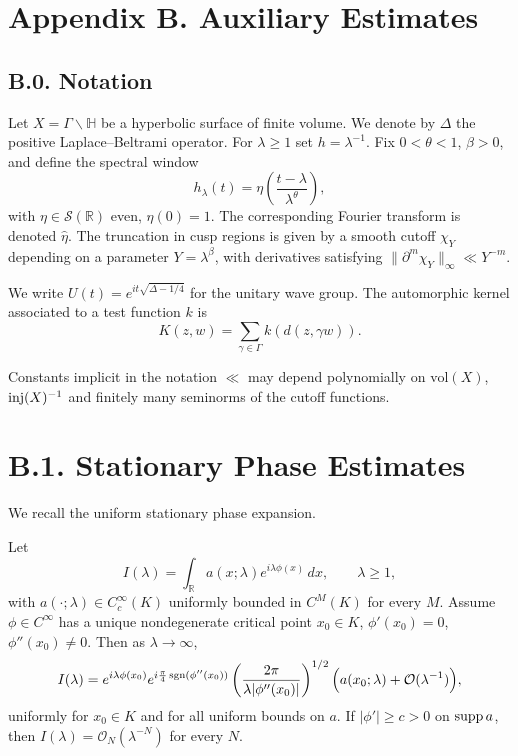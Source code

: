 \appendix
\section*{Appendix B. Auxiliary Estimates}

\subsection*{B.0. Notation}
Let $X=\Gamma\backslash \mathbb{H}$ be a hyperbolic surface of finite volume.
We denote by $\Delta$ the positive Laplace--Beltrami operator.
For $\lambda\ge 1$ set $h=\lambda^{-1}$.
Fix $0<\theta<1$, $\beta>0$, and define the spectral window
\[
h_\lambda(t)=\eta\!\left(\frac{t-\lambda}{\lambda^\theta}\right),
\]
with $\eta\in\mathcal{S}(\mathbb{R})$ even, $\eta(0)=1$.
The corresponding Fourier transform is denoted $\widehat{\eta}$.
The truncation in cusp regions is given by a smooth cutoff $\chi_Y$ depending on a parameter $Y=\lambda^\beta$, with derivatives satisfying $\|\partial^m\chi_Y\|_\infty\ll Y^{-m}$.

We write $U(t)=e^{it\sqrt{\Delta-1/4}}$ for the unitary wave group.
The automorphic kernel associated to a test function $k$ is
\[
K(z,w)=\sum_{\gamma\in\Gamma} k\!\left(d(z,\gamma w)\right).
\]

Constants implicit in the notation $\ll$ may depend polynomially on $\mathrm{vol}(X)$, $\operatorname{inj}(X)^{-1}$ and finitely many seminorms of the cutoff functions.

\section{B.1. Stationary Phase Estimates}\label{sec:B1}

We recall the uniform stationary phase expansion.

\begin{theorem}\label{thm:B1}
Let
\[
I(\lambda)=\int_{\mathbb{R}} a(x;\lambda)e^{i\lambda \phi(x)}\,dx,
\qquad \lambda\ge 1,
\]
with $a(\cdot;\lambda)\in C^\infty_c(K)$ uniformly bounded in $C^M(K)$ for every $M$.
Assume $\phi\in C^\infty$ has a unique nondegenerate critical point $x_0\in K$, $\phi'(x_0)=0$, $\phi''(x_0)\neq 0$.
Then as $\lambda\to\infty$,
\begin{equation}\label{eq:B1-stphase}
I(\lambda)=
e^{i\lambda \phi(x_0)}
e^{i\frac{\pi}{4}\operatorname{sgn}(\phi''(x_0))}
\left(\frac{2\pi}{\lambda|\phi''(x_0)|}\right)^{1/2}
\Big(a(x_0;\lambda)+\mathcal{O}(\lambda^{-1})\Big),
\end{equation}
uniformly for $x_0\in K$ and for all uniform bounds on $a$.
If $|\phi'|\ge c>0$ on $\operatorname{supp} a$, then $I(\lambda)=\mathcal{O}_N(\lambda^{-N})$ for every $N$.
\end{theorem}


